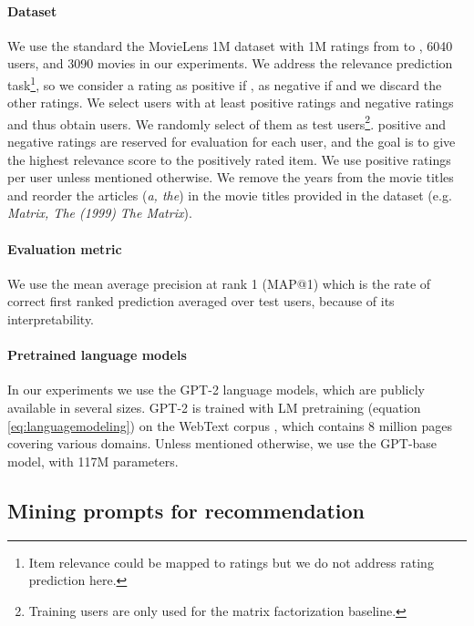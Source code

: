 \documentclass[runningheads]{llncs}
\begin{document}
\paragraph{\textbf{Dataset}} We use the standard the MovieLens 1M dataset \cite{harper15} with 1M ratings from  to , 6040 users, and 3090 movies in our experiments. We address the relevance prediction task\footnote{Item relevance could be mapped to ratings but we do not address rating prediction here.}, so we consider a rating  as positive if , as negative if   and we discard the other ratings. We select users with at least  positive ratings and  negative ratings and thus obtain  users. We  randomly select  of them as test users\footnote{Training users are only used for the matrix factorization baseline.}.  positive and  negative ratings are reserved for evaluation for each user, and the goal is to give the highest relevance score to the positively rated item. We use  positive ratings per user unless mentioned otherwise. We remove the years from the movie titles and reorder the articles (\textit{a, the}) in the movie titles provided in the dataset (e.g. \textit{Matrix, The (1999)}  \textit{The Matrix}).
 \vspace{-0.25cm}

 \paragraph{\textbf{Evaluation metric}} We use the mean average precision at rank 1 (MAP@1) \cite{schroder2011setting} which is the rate of correct first ranked prediction averaged over test users, because of its interpretability.
 \vspace{-0.25cm}
 
\paragraph{\textbf{Pretrained language models}} In our experiments we use the GPT-2 \cite{radford2019language} language models, which are publicly available in several sizes. GPT-2 is trained with LM pretraining (equation \ref{eq:languagemodeling}) on the WebText corpus \cite{radford2019language}, which contains 8 million pages covering various domains. Unless mentioned otherwise, we use the GPT-base model, with 117M parameters.

 \vspace{-0.1cm}



\subsection{Mining prompts for recommendation}
 \vspace{-0.1cm}
\end{document}
